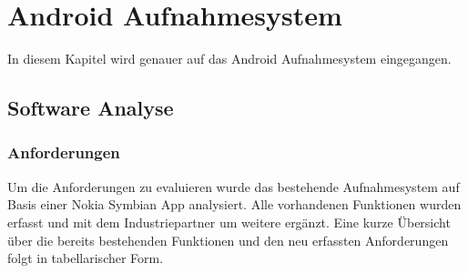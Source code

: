 \chapter{Android Aufnahmesystem}

In diesem Kapitel wird genauer auf das Android Aufnahmesystem eingegangen.

\section{Software Analyse}

\subsection{Anforderungen}

Um die Anforderungen zu evaluieren wurde das bestehende Aufnahmesystem auf Basis einer Nokia Symbian App analysiert. Alle vorhandenen Funktionen wurden erfasst und mit dem Industriepartner um weitere ergänzt. 
Eine kurze Übersicht über die bereits bestehenden Funktionen und den neu erfassten Anforderungen folgt in tabellarischer Form.

